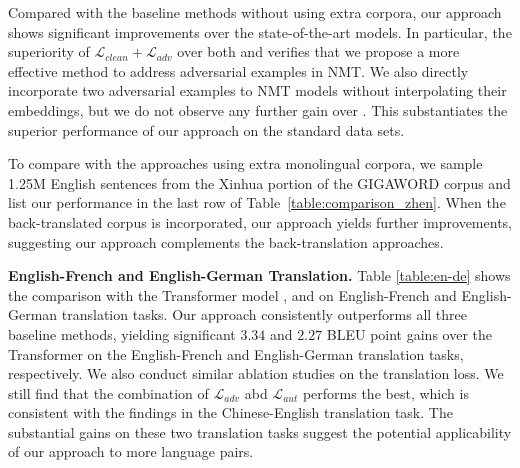\documentclass[11pt,a4paper]{article}
\begin{document}
Compared with the baseline methods without using extra corpora, our approach shows significant improvements over the state-of-the-art models. In particular, the superiority of $\mathcal{L}_{clean}+\mathcal{L}_{adv}$ over both \citet{Cheng:19} and \citet{Sano:19} verifies that we propose a more effective method to address adversarial examples in NMT. We also directly incorporate two adversarial examples to NMT models without interpolating their embeddings, but we do not observe any further gain over \citet{Cheng:19}. This substantiates the superior performance of our approach on the standard data sets.

To compare with the approaches using extra monolingual corpora, we sample 1.25M English sentences from the Xinhua portion of the GIGAWORD corpus and list our performance in the last row of Table~\ref{table:comparison_zhen}.
When the back-translated corpus is incorporated, our approach yields further improvements, suggesting our approach complements the back-translation approaches. 


\noindent\textbf{English-French and English-German Translation.} Table \ref{table:en-de} shows the comparison with the Transformer model \cite{Vaswani:17}, \citet{Sano:19} and \citet{Cheng:19} on English-French and English-German translation tasks.
Our approach consistently outperforms all three baseline methods, yielding significant $3.34$ and $2.27$ BLEU point gains over the Transformer on the English-French and English-German translation tasks, respectively.
We also conduct similar ablation studies on the translation loss.
We still find that the combination of $\mathcal{L}_{adv}$ abd $\mathcal{L}_{aut}$ performs the best, which is consistent with the findings in the Chinese-English translation task.
The substantial gains on these two translation tasks suggest the potential applicability of our approach to more language pairs.
\end{document}
